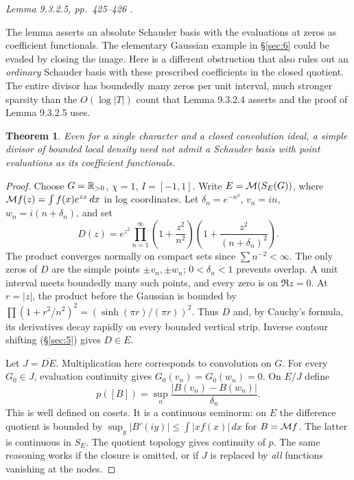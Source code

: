 \documentclass[11pt,reqno]{amsart}
\newtheorem{theorem}{Theorem}[section]
\numberwithin{equation}{section}
\begin{document}
\textit{Lemma 9.3.2.5, pp.~425--426 .}\par
The lemma asserts an absolute Schauder basis with the evaluations at zeros as coefficient functionals. The elementary Gaussian example in \S\ref{sec:6} could be evaded by closing the image. Here is a different obstruction that also rules out an \emph{ordinary} Schauder basis with these prescribed coefficients in the closed quotient. The entire divisor has boundedly many zeros per unit interval, much stronger sparsity than the \(O(\log|T|)\) count that Lemma 9.3.2.4 asserts and the proof of Lemma 9.3.2.5 uses.

\begin{theorem}Even for a single character and a closed convolution ideal, a simple divisor of bounded local density need not admit a Schauder basis with point evaluations as its coefficient functionals.\end{theorem}\begin{proof}
Choose \(G=\mathbb R_{>0}\), \(\chi=1\), \(I=[-1,1]\). Write \(E=\mathcal M(S_E(G))\), where \(\mathcal M f(z)=\int f(x)e^{zx}\,dx\) in log coordinates. Let \(\delta_n=e^{-n^3}\), \(v_n=in\), \(w_n=i(n+\delta_n)\), and set
\[
 D(z)=e^{z^2}\prod_{n=1}^\infty
 \left(1+\frac{z^2}{n^2}\right)\left(1+\frac{z^2}{(n+\delta_n)^2}\right).
\]
The product converges normally on compact sets since \(\sum n^{-2}<\infty\). The only zeros of \(D\) are the simple points \(\pm v_n,\pm w_n\); \(0<\delta_n<1\) prevents overlap. A unit interval meets boundedly many such points, and every zero is on \(\Re z=0\). At \(r=|z|\), the product before the Gaussian is bounded by \(\prod(1+r^2/n^2)^2=(\sinh(\pi r)/(\pi r))^2\). Thus \(D\) and, by Cauchy's formula, its derivatives decay rapidly on every bounded vertical strip. Inverse contour shifting (\S\ref{sec:5}) gives \(D\in E\).

Let \(J=\overline{D E}\). Multiplication here corresponds to convolution on \(G\). For every \(G_0\in J\), evaluation continuity gives \(G_0(v_n)=G_0(w_n)=0\). On \(E/J\) define
\[
        p([B])=\sup_n\frac{|B(v_n)-B(w_n)|}{\delta_n}.
\]
This is well defined on cosets. It is a continuous seminorm: on \(E\) the difference quotient is bounded by \(\sup_y|B'(iy)|\le\int |x f(x)|\,dx\) for \(B=\mathcal M f\). The latter is continuous in \(S_E\). The quotient topology gives continuity of \(p\). The same reasoning works if the closure is omitted, or if \(J\) is replaced by \emph{all} functions vanishing at the nodes.


\end{proof}
\end{document}
